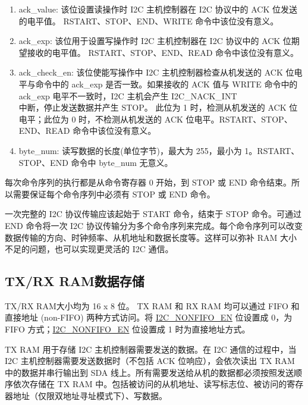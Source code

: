 \documentclass[main\_\_CN.tex]{subfiles}
\begin{document}
\begin{enumerate}
\begin{itemize}
\end{itemize}

\item ack\_value: 该位设置读操作时 I2C 主机控制器在 I2C 协议中的 ACK 位发送的电平值。 RSTART、STOP、END、WRITE 命令中该位没有意义。

\item ack\_exp: 该位用于设置写操作时 I2C 主机控制器在 I2C 协议中的 ACK 位期望接收的电平值。 RSTART、STOP、END、READ 命令中该位没有意义。

\item ack\_check\_en: 该位使能写操作中 I2C 主机控制器检查从机发送的 ACK 位电平与命令中的 ack\_exp 是否一致。如果接收的 ACK 值与 WRITE 命令中的 ack\_exp 电平不一致时，I2C 主机会产生 I2C\_NACK\_INT\\ 中断，停止发送数据并产生 STOP。 此位为 1 时，检测从机发送的 ACK 位电平；此位为 0 时，不检测从机发送的 ACK 位电平。RSTART、STOP、END、READ 命令中该位没有意义。

\item byte\_num: 读写数据的长度(单位字节)，最大为 255，最小为 1。RSTART、STOP、END 命令中 byte\_num 无意义。

\end{enumerate}

每次命令序列的执行都是从命令寄存器 0 开始，到 STOP 或 END 命令结束。所以需要保证每个命令序列中必须有 STOP 或 END 命令。

一次完整的 I2C 协议传输应该起始于 START 命令，结束于 STOP 命令。可通过 END 命令将一次 I2C 协议传输分为多个命令序列来完成。每个命令序列可以改变数据传输的方向、时钟频率、从机地址和数据长度等。这样可以弥补 RAM 大小不足的问题，也可以实现更灵活的 I2C 通信。

\subsection{TX/RX RAM数据存储}
\label{subsubsec:i2c-txrx}
TX/RX RAM大小均为 16 x 8 位。 TX RAM 和 RX RAM 均可以通过 FIFO 和直接地址 (non-FIFO) 两种方式访问。将 \hyperref[fielddesc:I2CNONFIFOEN]{I2C\_NONFIFO\_EN} 位设置成 0，为 FIFO 方式；\hyperref[fielddesc:I2CNONFIFOEN]{I2C\_NONFIFO\_EN} 位设置成 1 时为直接地址方式。

TX RAM 用于存储 I2C 主机控制器需要发送的数据。在 I2C 通信的过程中，当 I2C 主机控制器需要发送数据时（不包括 ACK 位响应），会依次读出 TX RAM 中的数据并串行输出到 SDA 线上。所有需要发送给从机的数据都必须按照发送顺序依次存储在 TX RAM 中。包括被访问的从机地址、读写标志位、被访问的寄存器地址（仅限双地址寻址模式下）、写数据。
\end{document}
